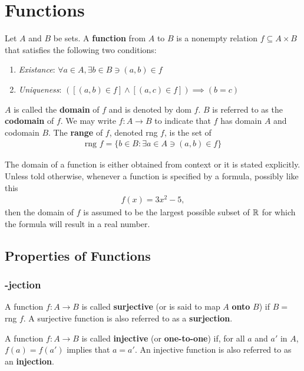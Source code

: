 \chapter{Functions}

\begin{definition}
	Let $A$ and $B$ be sets. A \textbf{function} from $A$ to $B$ is a nonempty relation $f\subseteq A\times B$ that satisfies the following two conditions:
	\begin{enumerate}
		\item \textit{Existance}: $\forall a\in A, \exists b\in B \ni (a,b)\in f$
		\item \textit{Uniqueness}: $([(a,b)\in f] \land [(a,c)\in f]) \implies (b=c)$ 
	\end{enumerate}
	$A$ is called the \textbf{domain} of $f$ and is denoted by dom $f$. $B$ is referred to as the \textbf{codomain} of $f$. We may write $f:A\rightarrow B$ to indicate that $f$ has domain $A$ and codomain $B$. The \textbf{range} of $f$, denoted rng $f$, is the set of 
	\begin{align*}
		\text{rng } f = \{b\in B:\exists a\in A \ni (a,b)\in f\} 
	\end{align*}
\end{definition}

The domain of a function is either obtained from context or it is stated explicitly. Unless told otherwise, whenever a function is specified by a formula, possibly like this
\begin{align*}
	f(x) = 3x^2-5,
\end{align*}
then the domain of $f$ is assumed to be the largest possible subset of $\mathbb{R}$ for which the formula will result in a real number.

\newpage
\section{Properties of Functions}

\subsection{-jection}
\begin{definition}[Surjection]
	A function $f:A\rightarrow B$ is called \textbf{surjective} (or is said to map $A$ \textbf{onto} $B$) if $B=$ rng $f$. A surjective function is also referred to as a \textbf{surjection}.
\end{definition}

\begin{definition}[Injection]
	A function $f:A\rightarrow B$ is called \textbf{injective} (or \textbf{one-to-one}) if, for all $a$ and $a'$ in $A$, $f(a)=f(a')$ implies that $a=a'$. An injective function is also referred to as an \textbf{injection}.
\end{definition}

